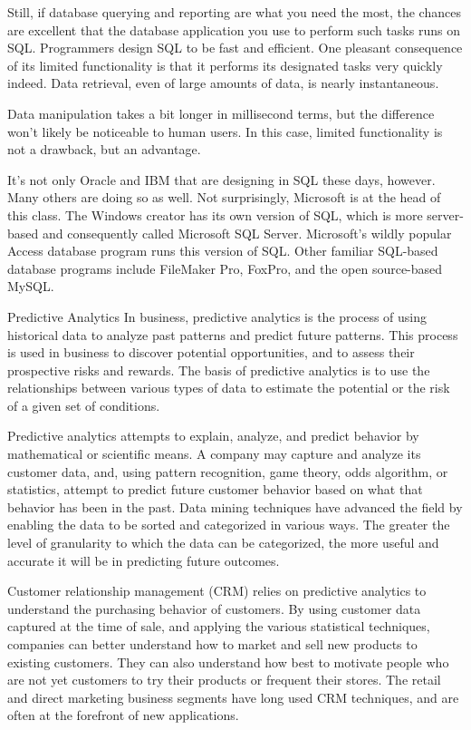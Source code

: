 Still, if database querying and reporting are what you need the most, the chances are excellent that the database application you use to perform such tasks runs on SQL. Programmers design SQL to be fast and efficient. One pleasant consequence of its limited functionality is that it performs its designated tasks very quickly indeed. Data retrieval, even of large amounts of data, is nearly instantaneous.
 
Data manipulation takes a bit longer in millisecond terms, but the difference won't likely be noticeable to human users. In this case, limited functionality is not a drawback, but an advantage.
 
It's not only Oracle and IBM that are designing in SQL these days, however. Many others are doing so as well. Not surprisingly, Microsoft is at the head of this class. The Windows creator has its own version of SQL, which is more server-based and consequently called Microsoft SQL Server. Microsoft's wildly popular Access database program runs this version of SQL. Other familiar SQL-based database programs include FileMaker Pro, FoxPro, and the open source-based MySQL.
 
Predictive Analytics 
In business, predictive analytics is the process of using historical data to analyze past patterns and predict future patterns. This process is used in business to discover potential opportunities, and to assess their prospective risks and rewards. The basis of predictive analytics is to use the relationships between various types of data to estimate the potential or the risk of a given set of conditions.
 
Predictive analytics attempts to explain, analyze, and predict behavior by mathematical or scientific means. A company may capture and analyze its customer data, and, using pattern recognition, game theory, odds algorithm, or statistics, attempt to predict future customer behavior based on what that behavior has been in the past. Data mining techniques have advanced the field by enabling the data to be sorted and categorized in various ways. The greater the level of granularity to which the data can be categorized, the more useful and accurate it will be in predicting future outcomes.
 
Customer relationship management (CRM) relies on predictive analytics to understand the purchasing behavior of customers. By using customer data captured at the time of sale, and applying the various statistical techniques, companies can better understand how to market and sell new products to existing customers. They can also understand how best to motivate people who are not yet customers to try their products or frequent their stores. The retail and direct marketing business segments have long used CRM techniques, and are often at the forefront of new applications.
 
